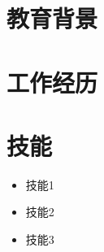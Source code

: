 \documentclass{resume}
\begin{document}

\section{教育背景}


\section{工作经历}


\section{技能}
\begin{itemize}
    \item 技能1
    \item 技能2
    \item 技能3
\end{itemize}
\end{document}

